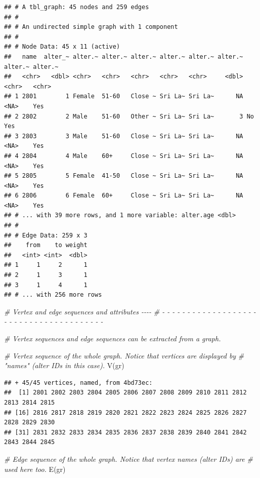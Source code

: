 \documentclass[
]{book}
\newenvironment{Shaded}{\begin{snugshade}}{\end{snugshade}}
\newcommand{\CommentTok}[1]{\textcolor[rgb]{0.56,0.35,0.01}{\textit{#1}}}
\newcommand{\FunctionTok}[1]{\textcolor[rgb]{0.00,0.00,0.00}{#1}}
\newcommand{\NormalTok}[1]{#1}
\begin{document}
\begin{verbatim}
## # A tbl_graph: 45 nodes and 259 edges
## #
## # An undirected simple graph with 1 component
## #
## # Node Data: 45 x 11 (active)
##   name  alter_~ alter.~ alter.~ alter.~ alter.~ alter.~ alter.~ alter.~ alter.~
##   <chr>   <dbl> <chr>   <chr>   <chr>   <chr>   <chr>     <dbl> <chr>   <chr>  
## 1 2801        1 Female  51-60   Close ~ Sri La~ Sri La~      NA <NA>    Yes    
## 2 2802        2 Male    51-60   Other ~ Sri La~ Sri La~       3 No      Yes    
## 3 2803        3 Male    51-60   Close ~ Sri La~ Sri La~      NA <NA>    Yes    
## 4 2804        4 Male    60+     Close ~ Sri La~ Sri La~      NA <NA>    Yes    
## 5 2805        5 Female  41-50   Close ~ Sri La~ Sri La~      NA <NA>    Yes    
## 6 2806        6 Female  60+     Close ~ Sri La~ Sri La~      NA <NA>    Yes    
## # ... with 39 more rows, and 1 more variable: alter.age <dbl>
## #
## # Edge Data: 259 x 3
##    from    to weight
##   <int> <int>  <dbl>
## 1     1     2      1
## 2     1     3      1
## 3     1     4      1
## # ... with 256 more rows
\end{verbatim}

\begin{Shaded}
\begin{Highlighting}[]
\CommentTok{\# Vertex and edge sequences and attributes                                  {-}{-}{-}{-}}
\CommentTok{\# {-} {-} {-} {-} {-} {-} {-} {-} {-} {-} {-} {-} {-} {-} {-} {-} {-} {-} {-} {-} {-} {-} {-} {-} {-} {-} {-} {-} {-} {-} {-} {-} {-} {-} {-} {-} {-} {-} {-} }

\CommentTok{\# Vertex sequences and edge sequences can be extracted from a graph.}

\CommentTok{\# Vertex sequence of the whole graph. Notice that vertices are displayed by}
\CommentTok{\# "names" (alter IDs in this case).}
\FunctionTok{V}\NormalTok{(gr)}
\end{Highlighting}
\end{Shaded}

\begin{verbatim}
## + 45/45 vertices, named, from 4bd73ec:
##  [1] 2801 2802 2803 2804 2805 2806 2807 2808 2809 2810 2811 2812 2813 2814 2815
## [16] 2816 2817 2818 2819 2820 2821 2822 2823 2824 2825 2826 2827 2828 2829 2830
## [31] 2831 2832 2833 2834 2835 2836 2837 2838 2839 2840 2841 2842 2843 2844 2845
\end{verbatim}

\begin{Shaded}
\begin{Highlighting}[]
\CommentTok{\# Edge sequence of the whole graph. Notice that vertex names (alter IDs) are}
\CommentTok{\# used here too.}
\FunctionTok{E}\NormalTok{(gr)}
\end{Highlighting}
\end{Shaded}
\end{document}
